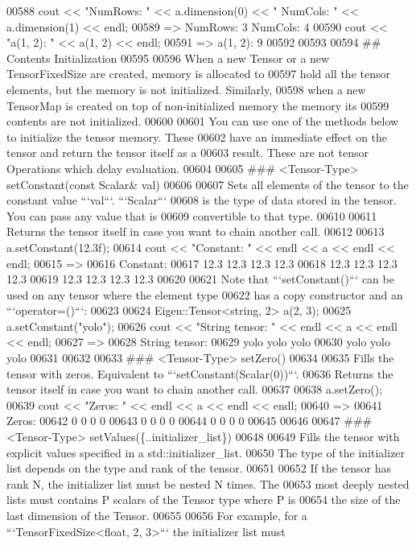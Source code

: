 \begin{DoxyCode}
00588     cout << "NumRows: " << a.dimension(0) << " NumCols: " << a.dimension(1) << endl;
00589     => NumRows: 3 NumCols: 4
00590     cout << "a(1, 2): " << a(1, 2) << endl;
00591     => a(1, 2): 9
00592 
00593 
00594 ## Contents Initialization
00595 
00596 When a new Tensor or a new TensorFixedSize are created, memory is allocated to
00597 hold all the tensor elements, but the memory is not initialized.  Similarly,
00598 when a new TensorMap is created on top of non-initialized memory the memory its
00599 contents are not initialized.
00600 
00601 You can use one of the methods below to initialize the tensor memory.  These
00602 have an immediate effect on the tensor and return the tensor itself as a
00603 result.  These are not tensor Operations which delay evaluation.
00604 
00605 ### <Tensor-Type> setConstant(const Scalar& val)
00606 
00607 Sets all elements of the tensor to the constant value ```val```.  ```Scalar```
00608 is the type of data stored in the tensor.  You can pass any value that is
00609 convertible to that type.
00610 
00611 Returns the tensor itself in case you want to chain another call.
00612 
00613     a.setConstant(12.3f);
00614     cout << "Constant: " << endl << a << endl << endl;
00615     =>
00616     Constant:
00617     12.3 12.3 12.3 12.3
00618     12.3 12.3 12.3 12.3
00619     12.3 12.3 12.3 12.3
00620 
00621 Note that ```setConstant()``` can be used on any tensor where the element type
00622 has a copy constructor and an ```operator=()```:
00623 
00624     Eigen::Tensor<string, 2> a(2, 3);
00625     a.setConstant("yolo");
00626     cout << "String tensor: " << endl << a << endl << endl;
00627     =>
00628     String tensor:
00629     yolo yolo yolo
00630     yolo yolo yolo
00631 
00632 
00633 ### <Tensor-Type> setZero()
00634 
00635 Fills the tensor with zeros.  Equivalent to ```setConstant(Scalar(0))```.
00636 Returns the tensor itself in case you want to chain another call.
00637 
00638     a.setZero();
00639     cout << "Zeros: " << endl << a << endl << endl;
00640     =>
00641     Zeros:
00642     0 0 0 0
00643     0 0 0 0
00644     0 0 0 0
00645 
00646 
00647 ### <Tensor-Type> setValues(\{..initializer\_list\})
00648 
00649 Fills the tensor with explicit values specified in a std::initializer\_list.
00650 The type of the initializer list depends on the type and rank of the tensor.
00651 
00652 If the tensor has rank N, the initializer list must be nested N times.  The
00653 most deeply nested lists must contains P scalars of the Tensor type where P is
00654 the size of the last dimension of the Tensor.
00655 
00656 For example, for a ```TensorFixedSize<float, 2, 3>``` the initializer list must

\end{DoxyCode}
